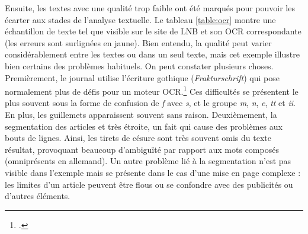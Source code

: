 \documentclass[a4paper,twoside,12pt]{article}
\begin{document}
Ensuite, les textes avec une qualité trop faible ont été marqués pour pouvoir les écarter aux stades de l'analyse textuelle. Le tableau \ref{table:ocr} montre une échantillon de texte tel que visible sur le site de LNB et son OCR correspondante (les erreurs sont surlignées en jaune). Bien entendu, la qualité peut varier considérablement entre les textes ou dans un seul texte, mais cet exemple illustre bien certains des problèmes habituels. On peut constater plusieurs choses. Premièrement, le journal utilise l'écriture gothique (\textit{Frakturschrift}) qui pose normalement plus de défis pour un moteur OCR.\footcite[Pour un aperçu des problématiques généraux de l'OCR des textes allemands (quoique avec un accent sur les XVII\textsuperscript{e}-XVIII\textsuperscript{e} siècles) et pour l'état de l'art autour du moment de la complétion de la numérisation des catalogues de LNB, cf. ][]{federbusch_volltext_2013} Ces difficultés se présentent le plus souvent sous la forme de confusion de \textit{f} avec \textit{s}, et le groupe \textit{m}, \textit{n}, \textit{e}, \textit{tt} et \textit{ii}. En plus, les guillemets \og \fg{} apparaissent souvent sans raison. Deuxièmement, la segmentation des articles et très étroite, un fait qui cause des problèmes aux bouts de lignes. Ainsi, les tirets de césure sont très souvent omis du texte résultat, provoquant beaucoup d'ambiguïté par rapport aux mots composés (omniprésents en allemand). Un autre problème lié à la segmentation n'est pas visible dans l'exemple mais se présente dans le cas d'une mise en page complexe : les limites d'un article peuvent être flous ou se confondre avec des publicités ou d'autres éléments.
\end{document}
